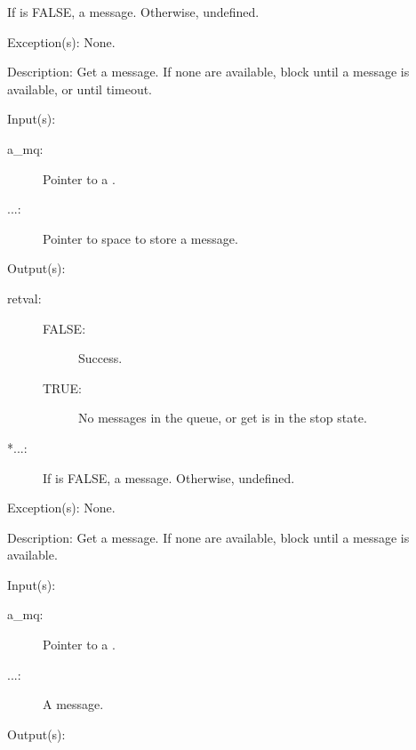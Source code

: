 \begin{capi}
\begin{capilist}
\begin{description}
			If  is FALSE, a message.  Otherwise,
			undefined.
		\end{description}
	\item[Exception(s): ] None.
	\item[Description: ]
		Get a message.  If none are available, block until a
		message is available, or until timeout.
	\end{capilist}
\label{mq_get}
	\begin{capilist}
	\item[Input(s): ]
		\begin{description}\item[]
		\item[a\_mq: ]
			Pointer to a .
		\item[...: ]
			Pointer to space to store a message.
		\end{description}
	\item[Output(s): ]
		\begin{description}\item[]
		\item[retval: ]
			\begin{description}\item[]
			\item[FALSE: ] Success.
			\item[TRUE: ] No messages in the queue, or get is
				in the stop state.
			\end{description}
		\item[*...: ]
			If  is FALSE, a message.  Otherwise,
			undefined.
		\end{description}
	\item[Exception(s): ] None.
	\item[Description: ]
		Get a message.  If none are available, block until a
		message is available.
	\end{capilist}
\label{mq_put}
	\begin{capilist}
	\item[Input(s): ]
		\begin{description}\item[]
		\item[a\_mq: ]
			Pointer to a \classname{mq}.
		\item[...: ]
			A message.
		\end{description}
	\item[Output(s): ]

\end{capilist}
\end{capi}
